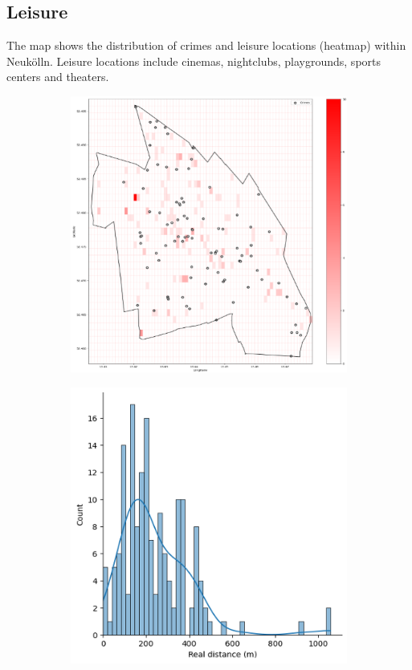 \subsection{Leisure}
The map shows the distribution of crimes and leisure locations (heatmap) within Neukölln. Leisure locations include cinemas, nightclubs, playgrounds, sports centers and theaters.
\begin{figure}[h]
    \centering
    \begin{subfigure}[b]{0.45\textwidth}
        \centering
        \includegraphics[width=\textwidth]{./figures/Gerard/leisure.png}
        \caption{}
        \label{fig:image1}
    \end{subfigure}
    \hfill
    \begin{subfigure}[b]{0.45\textwidth}
        \centering
        \includegraphics[width=\textwidth]{./figures/Gerard/leisure_1.png}

\end{subfigure}
\end{figure}
